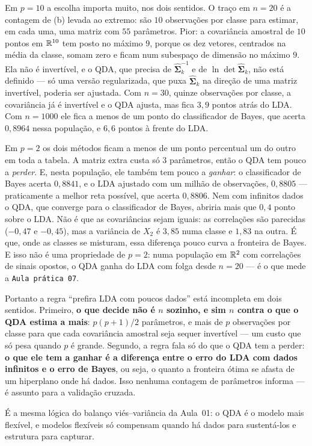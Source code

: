 \documentclass[11pt,a4paper]{article}
\begin{document}
\begin{solucao}
Em $p=10$ a escolha importa muito, nos dois sentidos. O traço em $n=20$ é a
contagem de (b) levada ao extremo: são $10$ observações por classe para estimar,
em cada uma, uma matriz com $55$ parâmetros. Pior: a covariância amostral de $10$
pontos em $\mathbb{R}^{10}$ tem posto no máximo $9$, porque os dez vetores, centrados na
média da classe, somam zero e ficam num subespaço de dimensão no máximo $9$. Ela
não é invertível, e o QDA, que precisa de $\widehat{\bm\Sigma}_k^{-1}$ e de
$\ln\det\widehat{\bm\Sigma}_k$, não está definido --- só uma versão regularizada,
que puxa $\widehat{\bm\Sigma}_k$ na direção de uma matriz invertível, poderia ser
ajustada. Com $n=30$, quinze observações por classe, a covariância já é invertível
e o QDA ajusta, mas fica $3{,}9$ pontos atrás do LDA. Com $n=1000$ ele fica a menos
de um ponto do classificador de Bayes, que acerta $0{,}8964$ nessa população, e
$6{,}6$ pontos à frente do LDA.

Em $p=2$ os dois métodos ficam a menos de um ponto percentual um do outro em toda
a tabela. A matriz extra custa só $3$ parâmetros, então o QDA tem pouco a
\emph{perder}. E, nesta população, ele também tem pouco a \emph{ganhar}: o
classificador de Bayes acerta $0{,}8841$, e o LDA ajustado com um milhão de
observações, $0{,}8805$ --- praticamente a melhor reta possível, que acerta
$0{,}8806$. Nem com infinitos dados o QDA, que converge para o classificador de
Bayes, abriria mais que $0{,}4$ ponto sobre o LDA. Não é que as covariâncias sejam
iguais: as correlações são parecidas ($-0{,}47$ e $-0{,}45$), mas a variância de
$X_2$ é $3{,}85$ numa classe e $1{,}83$ na outra. É que, onde as classes se
misturam, essa diferença pouco curva a fronteira de Bayes. E isso não é uma
propriedade de $p=2$: numa população em $\mathbb{R}^2$ com correlações de sinais opostos,
o QDA ganha do LDA com folga desde $n=20$ --- é o que mede a \texttt{Aula prática
07}.

Portanto a regra ``prefira LDA com poucos dados'' está incompleta em dois
sentidos. Primeiro, \textbf{o que decide não é $n$ sozinho, e sim $n$ contra o que
o QDA estima a mais}: $p(p+1)/2$ parâmetros, e mais de $p$ observações por classe
para que cada covariância amostral seja sequer invertível --- um custo que só pesa
quando $p$ é grande. Segundo, a regra fala só do que o QDA tem a perder:
\textbf{o que ele tem a ganhar é a diferença entre o erro do LDA com dados
infinitos e o erro de Bayes}, ou seja, o quanto a fronteira ótima se afasta de um
hiperplano onde há dados. Isso nenhuma contagem de parâmetros informa --- é
assunto para a validação cruzada.

É a mesma lógica do balanço viés--variância da Aula~01: o QDA é o modelo mais
flexível, e modelos flexíveis só compensam quando há dados para sustentá-los e
estrutura para capturar.
\end{solucao}
\end{document}

